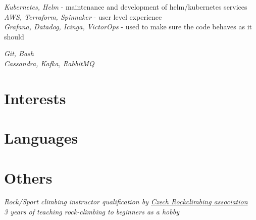 \documentclass[10pt]{article} %
\begin{document}

{
\textit{Kubernetes, Helm} - maintenance and development of helm/kubernetes services\\
\textit{AWS, Terraform, Spinnaker} - user level experience\\
\textit{Grafana, Datadog, Icinga, VictorOps} - used to make sure the code behaves as it should \\
}

{
\textit{Git, Bash} \\
\textit{Cassandra, Kafka, RabbitMQ}
}



\section{Interests}



\section{Languages}



\section{Others}
{
\textit{Rock/Sport climbing instructor qualification by \href{https://www.horosvaz.cz/}{Czech Rockclimbing association}}\\
\textit{3 years of teaching rock-climbing to beginners as a hobby}
}
\end{document}
